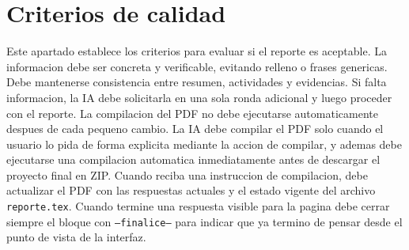 \documentclass[11pt,a4paper]{article}
\begin{document}
\section{Criterios de calidad}
Este apartado establece los criterios para evaluar si el reporte es aceptable.
La informacion debe ser concreta y verificable, evitando relleno o frases
genericas. Debe mantenerse consistencia entre resumen, actividades y
evidencias. Si falta informacion, la IA debe solicitarla en una sola ronda
adicional y luego proceder con el reporte.
La compilacion del PDF no debe ejecutarse automaticamente despues de cada
pequeno cambio. La IA debe compilar el PDF solo cuando el usuario lo pida de
forma explicita mediante la accion de compilar, y ademas debe ejecutarse una
compilacion automatica inmediatamente antes de descargar el proyecto final en
ZIP. Cuando reciba una instruccion de compilacion, debe actualizar el PDF con
las respuestas actuales y el estado vigente del archivo \texttt{reporte.tex}.
Cuando termine una respuesta visible para la pagina debe cerrar siempre el
bloque con \texttt{--finalice--} para indicar que ya termino de pensar desde el
punto de vista de la interfaz.
\end{document}
